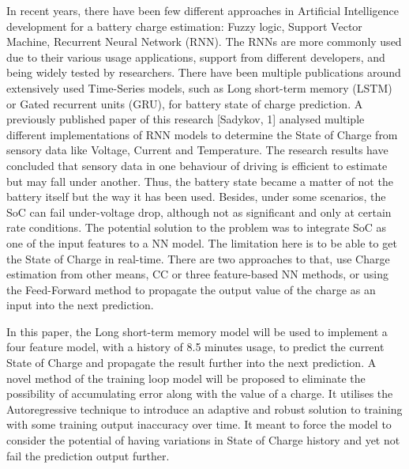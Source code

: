 %
%
In recent years, there have been few different approaches in Artificial Intelligence development for a battery charge estimation: Fuzzy logic, Support Vector Machine, Recurrent Neural Network (RNN).
The RNNs are more commonly used due to their various usage applications, support from different developers, and being widely tested by researchers.
There have been multiple publications around extensively used Time-Series models, such as Long short-term memory (LSTM) or Gated recurrent units (GRU), for battery state of charge prediction.
A previously published paper of this research [Sadykov, 1] analysed multiple different implementations of RNN models to determine the State of Charge from sensory data like Voltage, Current and Temperature.
The research results have concluded that sensory data in one behaviour of driving is efficient to estimate but may fall under another.
Thus, the battery state became a matter of not the battery itself but the way it has been used.
Besides, under some scenarios, the SoC can fail under-voltage drop, although not as significant and only at certain rate conditions.
The potential solution to the problem was to integrate SoC as one of the input features to a NN model.
The limitation here is to be able to get the State of Charge in real-time.
There are two approaches to that, use Charge estimation from other means, CC or three feature-based NN methods, or using the Feed-Forward method to propagate the output value of the charge as an input into the next prediction.

%
%
In this paper, the Long short-term memory model will be used to implement a four feature model, with a history of 8.5 minutes usage, to predict the current State of Charge and propagate the result further into the next prediction.
A novel method of the training loop model will be proposed to eliminate the possibility of accumulating error along with the value of a charge.
It utilises the Autoregressive technique to introduce an adaptive and robust solution to training with some training output inaccuracy over time.
It meant to force the model to consider the potential of having variations in State of Charge history and yet not fail the prediction output further.

